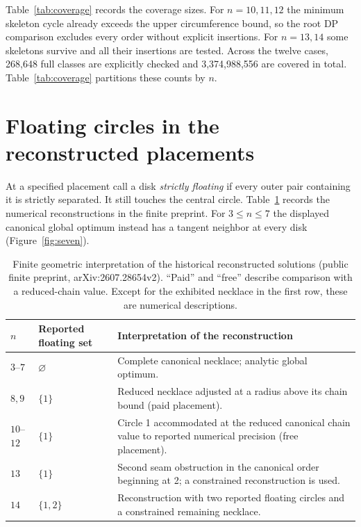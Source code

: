 \documentclass[11pt]{article}
\theoremstyle{definition}
\theoremstyle{remark}
\begin{document}
Table~\ref{tab:coverage} records the coverage sizes. For $n=10,11,12$
the minimum skeleton cycle already exceeds the upper circumference bound,
so the root DP comparison excludes every order without explicit insertions.
For $n=13,14$ some skeletons survive and all their insertions are tested.
Across the twelve cases, 268,648 full classes are explicitly checked and
3,374,988,556 are covered in total. Table~\ref{tab:coverage} partitions these counts by $n$.

\begin{table}[htbp]\centering
\caption{Complete lower coverage recomputed by the exact verifier.
An en dash indicates direct full-order enumeration. Zero explicit orders
at $n=10,11,12$ means the root skeleton bound excludes the whole domain.}
\label{tab:coverage}

\end{table}

\section{Floating circles in the reconstructed placements}\label{sec:floating}
At a specified placement call a disk \emph{strictly floating} if every
outer pair containing it is strictly separated. It still touches the
central circle. Table~\ref{tab:regimes} records the numerical reconstructions
in the finite preprint. For $3\le n\le7$ the displayed canonical global
optimum instead has a tangent neighbor at every disk (Figure~\ref{fig:seven}).

\begin{table}[htbp]\centering\small
\caption{Finite geometric interpretation of the historical reconstructed
solutions (public finite preprint, arXiv:2607.28654v2). ``Paid'' and ``free''
describe comparison with a reduced-chain value. Except for the exhibited
necklace in the first row, these are numerical descriptions.}
\label{tab:regimes}
\begin{tabularx}{\textwidth}{llX}\toprule
$n$ & Reported floating set & Interpretation of the reconstruction\\\midrule
$3$--$7$ & $\varnothing$ & Complete canonical necklace; analytic global optimum.\\
$8,9$ & $\{1\}$ & Reduced necklace adjusted at a radius above its chain bound (paid placement).\\
$10$--$12$ & $\{1\}$ & Circle 1 accommodated at the reduced canonical chain value to reported numerical precision (free placement).\\
$13$ & $\{1\}$ & Second seam obstruction in the canonical order beginning at 2; a constrained reconstruction is used.\\
$14$ & $\{1,2\}$ & Reconstruction with two reported floating circles and a constrained remaining necklace.\\\bottomrule
\end{tabularx}
\end{table}
\end{document}
